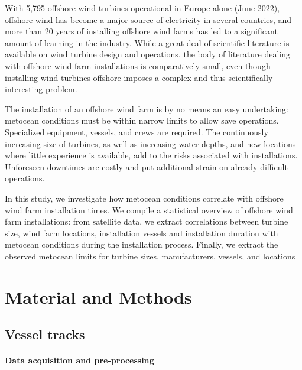 \documentclass[wes, manuscript]{copernicus}
\begin{document}


\introduction  %

With 5,795 offshore wind turbines operational in Europe alone (June 2022),
offshore wind has become a major source of electricity in several countries, 
and more than 20 years of installing offshore wind farms has led to a significant
amount of learning in the industry. While a great deal of scientific 
literature is available on wind turbine design and operations, the body of 
literature dealing with offshore wind farm installations is 
comparatively small, even though installing wind turbines offshore imposes a
complex and thus scientifically interesting problem.

The installation of an offshore wind farm is by no means an easy undertaking: 
metocean conditions must be within narrow limits to allow save operations. 
Specialized equipment, vessels, and crews are required. The continuously 
increasing size of turbines, as well as increasing water depths, and new locations 
where little experience is available, add to the risks associated with installations. 
Unforeseen downtimes are costly and put additional strain on already difficult operations. 

In this study, we investigate how metocean conditions correlate with offshore wind farm 
installation times. We compile a statistical overview of offshore wind farm installations: 
from satellite data, we extract correlations between turbine size, wind farm locations, 
installation vessels and installation duration with metocean conditions during the installation process. Finally, we extract the observed metocean limits for turbine sizes, manufacturers, vessels, and locations

\section{Material and Methods}

\subsection{Vessel tracks}

\paragraph{Data acquisition and pre-processing}
\end{document}
